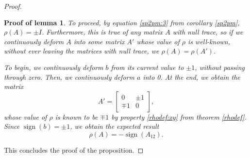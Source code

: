\documentclass{article}
\theoremstyle{nonumberplain}
\newtheorem{proof}{Proof}
\newtheorem{lemmaproof}{Proof of lemma}
\DeclareMathOperator{\sign}{sign}
\begin{document}
\begin{proof}
\begin{lemmaproof}
To proceed, by equation \eqref{sp2pm:3} from corollary \ref{sp2pm}, $\rho(A) = \pm I$. Furthermore, this is true of any matrix $A$ with null trace, so if we continuously deform $A$ into some matrix $A'$ whose value of $\rho$ is well-known, without ever leaving the matrices with null trace, we $\rho(A) = \rho(A')$.

To begin, we continuously deform $b$ from its current value to $\pm 1$, without passing through zero. Then, we continuously deform $a$ into 0. At the end, we obtain the matrix
\begin{equation}
A' = \begin{bmatrix}
0 & \pm 1\\
\mp 1 & 0
\end{bmatrix},
\end{equation}
whose value of $\rho$ is known to be $\mp 1$ by property \ref{rhodef:xy} from theorem \ref{rhodef}. Since $\sign(b) = \pm 1$, we obtain the expected result
\begin{equation}
\rho(A) = - \sign(A_{12}).
\end{equation}
\end{lemmaproof}

This concludes the proof of the proposition.
\end{proof}



\end{document}
